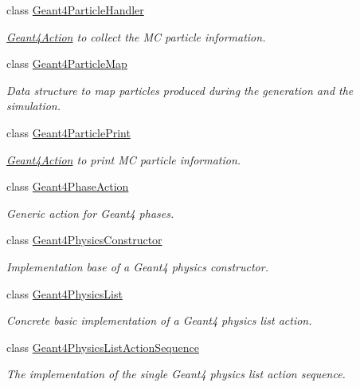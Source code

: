 \begin{DoxyCompactItemize}
class \hyperlink{class_d_d4hep_1_1_simulation_1_1_geant4_particle_handler}{Geant4\+Particle\+Handler}
\begin{DoxyCompactList}\small\item\em \hyperlink{class_d_d4hep_1_1_simulation_1_1_geant4_action}{Geant4\+Action} to collect the MC particle information. \end{DoxyCompactList}\item 
class \hyperlink{class_d_d4hep_1_1_simulation_1_1_geant4_particle_map}{Geant4\+Particle\+Map}
\begin{DoxyCompactList}\small\item\em Data structure to map particles produced during the generation and the simulation. \end{DoxyCompactList}\item 
class \hyperlink{class_d_d4hep_1_1_simulation_1_1_geant4_particle_print}{Geant4\+Particle\+Print}
\begin{DoxyCompactList}\small\item\em \hyperlink{class_d_d4hep_1_1_simulation_1_1_geant4_action}{Geant4\+Action} to print MC particle information. \end{DoxyCompactList}\item 
class \hyperlink{class_d_d4hep_1_1_simulation_1_1_geant4_phase_action}{Geant4\+Phase\+Action}
\begin{DoxyCompactList}\small\item\em Generic action for Geant4 phases. \end{DoxyCompactList}\item 
class \hyperlink{class_d_d4hep_1_1_simulation_1_1_geant4_physics_constructor}{Geant4\+Physics\+Constructor}
\begin{DoxyCompactList}\small\item\em Implementation base of a Geant4 physics constructor. \end{DoxyCompactList}\item 
class \hyperlink{class_d_d4hep_1_1_simulation_1_1_geant4_physics_list}{Geant4\+Physics\+List}
\begin{DoxyCompactList}\small\item\em Concrete basic implementation of a Geant4 physics list action. \end{DoxyCompactList}\item 
class \hyperlink{class_d_d4hep_1_1_simulation_1_1_geant4_physics_list_action_sequence}{Geant4\+Physics\+List\+Action\+Sequence}
\begin{DoxyCompactList}\small\item\em The implementation of the single Geant4 physics list action sequence. \end{DoxyCompactList}\item 

\end{DoxyCompactItemize}

